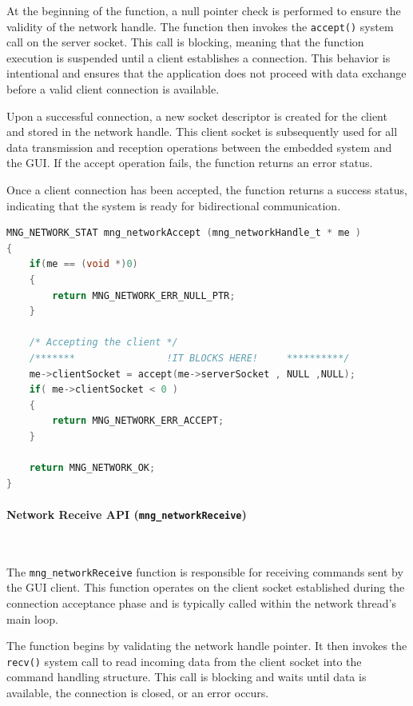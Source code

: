 At the beginning of the function, a null pointer check is performed to ensure the 
validity of the network handle. The function then invokes the \texttt{accept()} system 
call on the server socket. This call is blocking, meaning that the function execution 
is suspended until a client establishes a connection. This behavior is intentional 
and ensures that the application does not proceed with data exchange before a valid 
client connection is available.

Upon a successful connection, a new socket descriptor is created for the client and 
stored in the network handle. This client socket is subsequently used for all data 
transmission and reception operations between the embedded system and the GUI. If the 
accept operation fails, the function returns an error status.

Once a client connection has been accepted, the function returns a success status, 
indicating that the system is ready for bidirectional communication.

\begin{lstlisting}[language=C,
caption={Network Accept API},
label={lst:mng_networkAccept_api}]
MNG_NETWORK_STAT mng_networkAccept (mng_networkHandle_t * me )
{
    if(me == (void *)0)
    {
        return MNG_NETWORK_ERR_NULL_PTR;
    }

    /* Accepting the client */
    /*******                !IT BLOCKS HERE!     **********/
    me->clientSocket = accept(me->serverSocket , NULL ,NULL);
    if( me->clientSocket < 0 )
    {
        return MNG_NETWORK_ERR_ACCEPT;
    }
    
    return MNG_NETWORK_OK;
}
\end{lstlisting}


\paragraph{Network Receive API (\texttt{mng\_networkReceive})}\

The \texttt{mng\_networkReceive} function is responsible for receiving commands sent by 
the GUI client. This function operates on the client socket established during the 
connection acceptance phase and is typically called within the network thread’s main 
loop.

The function begins by validating the network handle pointer. It then invokes the 
\texttt{recv()} system call to read incoming data from the client socket into the 
command handling structure. This call is blocking and waits until data is available, 
the connection is closed, or an error occurs.

